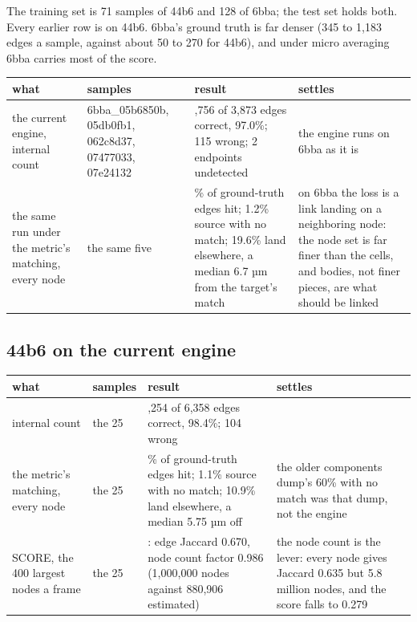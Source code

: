 The training set is 71 samples of 44b6 and 128 of 6bba; the test set holds both. Every earlier row is on 44b6. 6bba's ground truth is far denser (345 to 1,183 edges a sample, against about 50 to 270 for 44b6), and under micro averaging 6bba carries most of the score.

{\footnotesize
\setlength{\tabcolsep}{6pt}
\begin{longtable}{>{\RaggedRight\arraybackslash}p{}>{\RaggedRight\arraybackslash}p{}>{\RaggedRight\arraybackslash}p{}>{\RaggedRight\arraybackslash}p{}}
\toprule
what & samples & result & settles \\
\midrule
\endhead
the current engine, internal count & 6bba\_\allowbreak{}05b6850b, 05db0fb1, 062c8d37, 07477033, 07e24132 & 3,756 of 3,873 edges correct, 97.0\%; 115 wrong; 2 endpoints undetected & the engine runs on 6bba as it is \\
the same run under the metric's matching, every node & the same five & 78.5\% of ground-truth edges hit; 1.2\% source with no match; 19.6\% land elsewhere, a median 6.7 µm from the target's match & on 6bba the loss is a link landing on a neighboring node: the node set is far finer than the cells, and bodies, not finer pieces, are what should be linked \\
\bottomrule
\end{longtable}
}

\subsection{\texorpdfstring{44b6 on the current engine}{44b6 on the current engine}}

{\footnotesize
\setlength{\tabcolsep}{6pt}
\begin{longtable}{>{\RaggedRight\arraybackslash}p{}>{\RaggedRight\arraybackslash}p{}>{\RaggedRight\arraybackslash}p{}>{\RaggedRight\arraybackslash}p{}}
\toprule
what & samples & result & settles \\
\midrule
\endhead
internal count & the 25 & 6,254 of 6,358 edges correct, 98.4\%; 104 wrong &  \\
the metric's matching, every node & the 25 & 87.1\% of ground-truth edges hit; 1.1\% source with no match; 10.9\% land elsewhere, a median 5.75 µm off & the older components dump's 60\% with no match was that dump, not the engine \\
SCORE, the 400 largest nodes a frame & the 25 & 0.661: edge Jaccard 0.670, node count factor 0.986 (1,000,000 nodes against 880,906 estimated) & the node count is the lever: every node gives Jaccard 0.635 but 5.8 million nodes, and the score falls to 0.279 \\
\bottomrule
\end{longtable}
}
